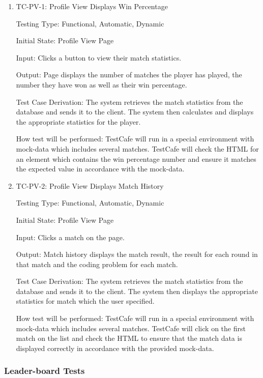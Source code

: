 \documentclass[12pt, titlepage]{article}
\begin{document}
\begin{enumerate}
\item {TC-PV-1: Profile View Displays Win Percentage}

Testing Type: Functional, Automatic, Dynamic
					
Initial State: Profile View Page
					
Input: Clicks a button to view their match statistics.
					
Output: Page displays the number of matches the player has played, the number they have won as well as their win percentage.

Test Case Derivation: The system retrieves the match statistics from the database and sends it to the client. The system then calculates and displays the appropriate statistics for the player.
					
How test will be performed: TestCafe will run in a special environment with mock-data which includes several matches. TestCafe will check the HTML for an element which contains the win percentage number and ensure it matches the expected value in accordance with the mock-data.

\item {TC-PV-2: Profile View Displays Match History}

Testing Type: Functional, Automatic, Dynamic
					
Initial State: Profile View Page
					
Input: Clicks a match on the page.
					
Output: Match history displays the match result, the result for each round in that match and the coding problem for each match.

Test Case Derivation: The system retrieves the match statistics from the database and sends it to the client. The system then displays the appropriate statistics for match which the user specified.
					
How test will be performed: TestCafe will run in a special environment with mock-data which includes several matches. TestCafe will click on the first match on the list and check the HTML to ensure that the match data is displayed correctly in accordance with the provided mock-data.

\end{enumerate}

\subsubsection{Leader-board Tests}
\end{document}
